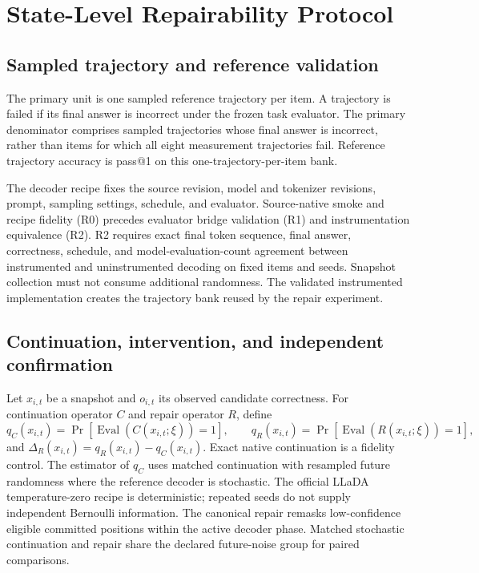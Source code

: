 \section{State-Level Repairability Protocol}

\subsection{Sampled trajectory and reference validation}
The primary unit is one sampled reference trajectory per item. A trajectory is
failed if its final answer is incorrect under the frozen task evaluator.
The primary denominator comprises sampled trajectories whose final answer is
incorrect, rather than items for which all eight measurement trajectories fail.
Reference trajectory accuracy is pass@1 on this one-trajectory-per-item bank.

The decoder recipe fixes the source revision, model and tokenizer revisions,
prompt, sampling settings, schedule, and evaluator. Source-native smoke and recipe fidelity (R0) precedes evaluator bridge validation (R1) and instrumentation
equivalence (R2). R2 requires exact final token sequence, final answer,
correctness, schedule, and model-evaluation-count agreement between instrumented
and uninstrumented decoding on fixed items and seeds. Snapshot collection must
not consume additional randomness. The validated instrumented implementation
creates the trajectory bank reused by the repair experiment.

\subsection{Continuation, intervention, and independent confirmation}
Let $x_{i,t}$ be a snapshot and $o_{i,t}$ its observed candidate correctness.
For continuation operator $C$ and repair operator $R$, define
\[
q_C(x_{i,t})=\Pr[\operatorname{Eval}(C(x_{i,t};\xi))=1],\qquad
q_R(x_{i,t})=\Pr[\operatorname{Eval}(R(x_{i,t};\xi))=1],
\]
and $\Delta_R(x_{i,t})=q_R(x_{i,t})-q_C(x_{i,t})$.
Exact native continuation is a fidelity control. The estimator of $q_C$ uses
matched continuation with resampled future randomness where the reference
decoder is stochastic. The official LLaDA temperature-zero recipe is
deterministic; repeated seeds do not supply independent Bernoulli information.
The canonical repair remasks low-confidence eligible committed positions within
the active decoder phase. Matched stochastic continuation and repair share the
declared future-noise group for paired comparisons.

